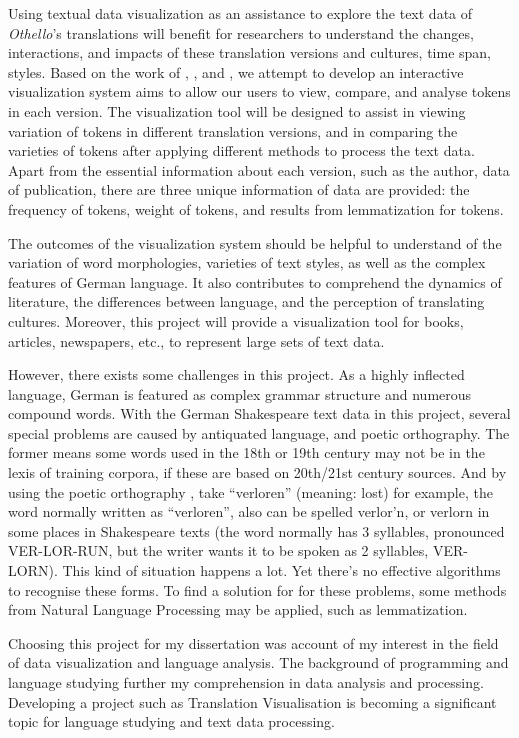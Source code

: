 Using textual data visualization as an assistance to explore the text data of \emph{Othello}’s translations will benefit for researchers to understand the changes, interactions, and impacts of these translation versions and cultures, time span, styles\cite{Alrehiely2014}. Based on the work of \cite{Geng2015}, \cite{Alrehiely2014}, and \cite{Tom2012a}, we attempt to develop an interactive visualization system aims to allow our users to view, compare, and analyse tokens in each version. The visualization tool will be designed to assist in viewing variation of tokens in different translation versions, and in comparing the varieties of tokens after applying different methods to process the text data. Apart from the essential information about each version, such as the author, data of publication, there are three unique information of data are provided: the frequency of tokens, weight of tokens, and results from lemmatization for tokens. 

The outcomes of the visualization system should be helpful to understand of the variation of word morphologies, varieties of text styles, as well as the complex features of German language. It also contributes to comprehend the dynamics of literature, the differences between language, and the perception of translating cultures. Moreover, this project will provide a visualization tool for books, articles, newspapers, etc., to represent large sets of text data.  

However, there exists some challenges in this project. As a highly inflected language, German is featured as complex grammar structure and numerous compound words. With the German Shakespeare text data in this project, several special problems are caused by antiquated language, and poetic orthography. The former means some words used in the 18th or 19th century may not be in the lexis of training corpora, if these are based on 20th/21st century sources. And by using the poetic orthography , take “verloren” (meaning: lost) for example, the word normally written as “verloren”, also can be spelled verlor'n, or verlorn in some places in Shakespeare texts (the word normally has 3 syllables, pronounced VER-LOR-RUN, but the writer wants it to be spoken as 2 syllables, VER-LORN). This kind of situation happens a lot. Yet there’s no effective algorithms to recognise these forms. To find a solution for for these problems, some methods from Natural Language Processing may be applied, such as lemmatization.

Choosing this project for my dissertation was account of my interest in the field of data visualization and language analysis. The background of programming and language studying further my comprehension in data analysis and processing. Developing a project such as Translation Visualisation is becoming a significant topic for language studying and text data processing.

